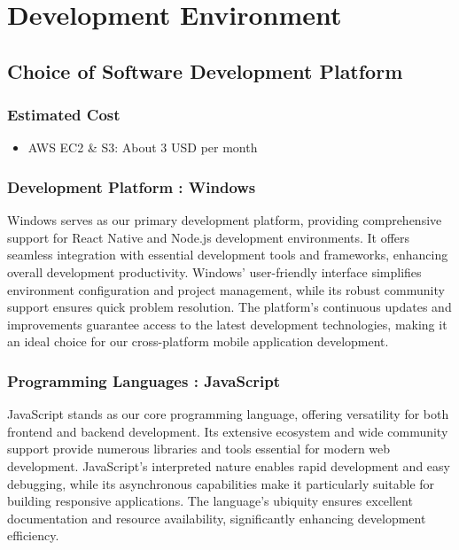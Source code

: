 \documentclass[conference]{IEEEtran}
\begin{document}
\section{Development Environment}
    \subsection{Choice of Software Development Platform}
        \subsubsection{Estimated Cost}
            \begin{itemize}
                \item AWS EC2 \& S3: About 3 USD per month
            \end{itemize}
        
        \subsubsection{Development Platform : Windows}
            Windows serves as our primary development platform, providing comprehensive support for React Native and Node.js development environments. It offers seamless integration with essential development tools and frameworks, enhancing overall development productivity. Windows' user-friendly interface simplifies environment configuration and project management, while its robust community support ensures quick problem resolution. The platform's continuous updates and improvements guarantee access to the latest development technologies, making it an ideal choice for our cross-platform mobile application development.

        \subsubsection{Programming Languages : JavaScript}
            JavaScript stands as our core programming language, offering versatility for both frontend and backend development. Its extensive ecosystem and wide community support provide numerous libraries and tools essential for modern web development. JavaScript's interpreted nature enables rapid development and easy debugging, while its asynchronous capabilities make it particularly suitable for building responsive applications. The language's ubiquity ensures excellent documentation and resource availability, significantly enhancing development efficiency.
\end{document}
